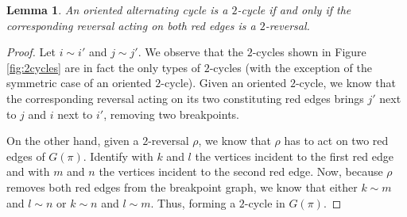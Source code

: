 \documentclass[11pt,DIV=11]{scrartcl}
\newtheorem{lemma}[theorem]{Lemma}
\theoremstyle{definition}
\theoremstyle{remark}
\begin{document}
\begin{lemma}
\label{lem:1}
An oriented alternating cycle is a $2$-cycle if and only if the corresponding reversal acting on both red edges is a $2$-reversal.
\end{lemma}

\begin{proof}
Let $i \sim i'$ and $j \sim j'$. We observe that the $2$-cycles shown in Figure \ref{fig:2cycles} are in fact the only types of $2$-cycles (with the exception of the symmetric case of an oriented $2$-cycle). Given an oriented $2$-cycle, we know that the corresponding reversal acting on its two constituting red edges brings $j'$ next to $j$ and $i$ next to $i'$, removing two breakpoints.

On the other hand, given a $2$-reversal $\rho$, we know that $\rho$ has to act on two red edges of $G(\pi)$. Identify with $k$ and $l$ the vertices incident to the first red edge and with $m$ and $n$ the vertices incident to the second red edge. Now, because $\rho$ removes both red edges from the breakpoint graph, we know that either $k \sim m$ and $l \sim n$ or $k \sim n$ and $l \sim m$. Thus, forming a $2$-cycle in $G(\pi)$.
\end{proof}
\end{document}

